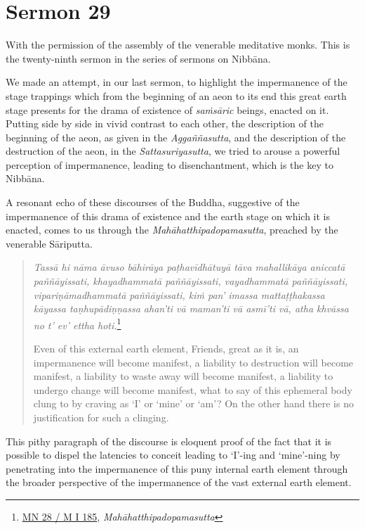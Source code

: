 \chapter{Sermon 29}

\NibbanaOpeningQuote

With the permission of the assembly of the venerable meditative monks. This is the twenty-ninth sermon in the series of sermons on Nibbāna.

We made an attempt, in our last sermon, to highlight the impermanence of the stage trappings which from the beginning of an aeon to its end this great earth stage presents for the drama of existence of \emph{saṁsāric} beings, enacted on it. Putting side by side in vivid contrast to each other, the description of the beginning of the aeon, as given in the \emph{Aggaññasutta}, and the description of the destruction of the aeon, in the \emph{Sattasuriyasutta}, we tried to arouse a powerful perception of impermanence, leading to disenchantment, which is the key to Nibbāna.

A resonant echo of these discourses of the Buddha, suggestive of the impermanence of this drama of existence and the earth stage on which it is enacted, comes to us through the \emph{Mahāhatthipadopamasutta}, preached by the venerable Sāriputta.

\begin{quote}
\emph{Tassā hi nāma āvuso bāhirāya paṭhavīdhātuyā tāva mahallikāya aniccatā paññāyissati, khayadhammatā paññāyissati, vayadhammatā paññāyissati, vipariṇāmadhammatā paññāyissati, kiṁ pan' imassa mattaṭṭhakassa kāyassa taṇhupādiṇṇassa ahan'ti vā maman'ti vā asmī'ti vā, atha khvāssa no t' ev' ettha hoti.}\footnote{\href{https://suttacentral.net/mn28/pli/ms}{MN 28 / M I 185}, \emph{Mahāhatthipadopamasutta}}

Even of this external earth element, Friends, great as it is, an impermanence will become manifest, a liability to destruction will become manifest, a liability to waste away will become manifest, a liability to undergo change will become manifest, what to say of this ephemeral body clung to by craving as `I' or `mine' or `am'? On the other hand there is no justification for such a clinging.
\end{quote}

This pithy paragraph of the discourse is eloquent proof of the fact that it is possible to dispel the latencies to conceit leading to `I'-ing and `mine'-ning by penetrating into the impermanence of this puny internal earth element through the broader perspective of the impermanence of the vast external earth element.

